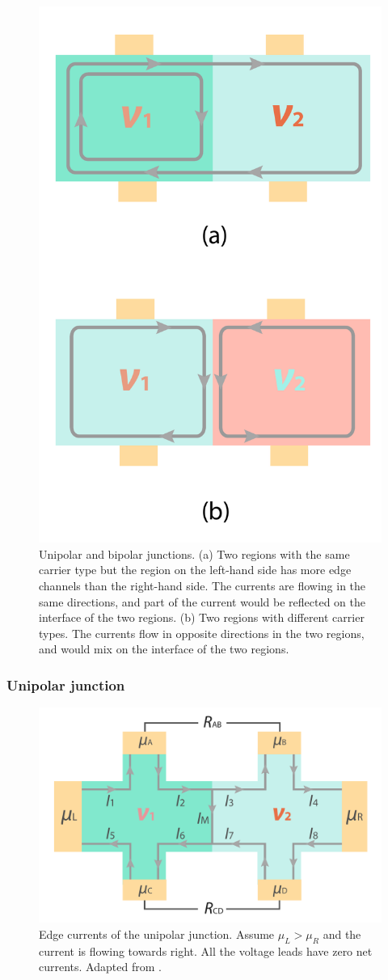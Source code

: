 \documentclass[pdflatex, sectionletters, 12pt, final, phd]{pittetd}    %
\begin{document}
\begin{figure}[h!]
	\centering
	\vspace{0.85cm}
	\includegraphics[width=.4\textwidth]{Drawing/Mixing.pdf}
	\caption[Unipolar and bipolar junctions]{Unipolar and bipolar junctions. (a) Two regions with the same carrier type but the region on the left-hand side has more edge channels than the right-hand side. The currents are flowing in the same directions, and part of the current would be reflected on the interface of the two regions. (b) Two regions with different carrier types. The currents flow in opposite directions in the two regions, and would mix on the interface of the two regions.}
	\label{FIG:Mixing}
\end{figure}

\subsubsection{Unipolar junction}

\begin{figure}[h!]
	\centering
	\includegraphics[width=.7\textwidth]{Drawing/Unipolar.pdf}
	\caption[Edge currents of the unipolar junction]{Edge currents of the unipolar junction. Assume $\mu_L > \mu_R$ and the current is flowing towards right. All the voltage leads have zero net currents. Adapted from \cite{li2019reconfigurable}.}
	\label{FIG:Unipolar}
\end{figure}
\end{document}
